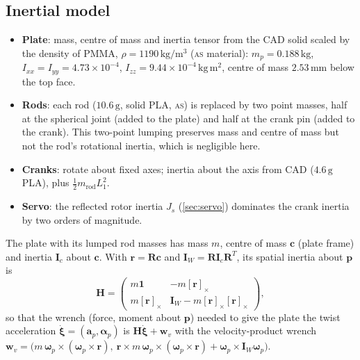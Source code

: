 \documentclass[10pt,a4paper]{article}
\newcommand{\un}[1]{\,\mathrm{#1}}
\newcommand{\vect}[1]{\bm{#1}}
\newcommand{\tagAS}{\textsc{as}}
\begin{document}
\subsection{Inertial model}
\begin{itemize}
  \item \textbf{Plate}: mass, centre of mass and inertia tensor from the CAD solid scaled by the
        density of PMMA, $\rho=1190\un{kg/m^3}$ (\tagAS{} material): $m_p=0.188\un{kg}$,
        $I_{xx}=I_{yy}=4.73\times10^{-4}$, $I_{zz}=9.44\times10^{-4}\un{kg\,m^2}$, centre of
        mass $2.53\un{mm}$ below the top face.
  \item \textbf{Rods}: each rod ($10.6\un{g}$, solid PLA, \tagAS) is replaced by two point masses,
        half at the spherical joint (added to the plate) and half at the crank pin (added to the
        crank). This two-point lumping preserves mass and centre of mass but not the rod's
        rotational inertia, which is negligible here.
  \item \textbf{Cranks}: rotate about fixed axes; inertia about the axis from CAD
        ($4.6\un{g}$ PLA), plus $\tfrac12 m_{\mathrm{rod}}L_1^2$.
  \item \textbf{Servo}: the reflected rotor inertia $J_s$ (\cref{sec:servo}) dominates the crank
        inertia by two orders of magnitude.
\end{itemize}
The plate with its lumped rod masses has mass $m$, centre of mass $\vect c$ (plate frame) and
inertia $\vect I_c$ about $\vect c$. With $\vect r=\vect R\vect c$ and
$\vect I_W=\vect R\vect I_c\vect R^T$, its spatial inertia about $\vect p$
\citep{featherstone2008rigid} is
\begin{equation}
  \vect H=\begin{pmatrix} m\vect 1 & -m[\vect r]_\times\\ m[\vect r]_\times & \vect I_W-m[\vect r]_\times[\vect r]_\times\end{pmatrix},
\end{equation}
so that the wrench (force, moment about $\vect p$) needed to give the plate the twist
acceleration $\dot{\vect\xi}=(\vect a_p,\vect\alpha_p)$ is $\vect H\dot{\vect\xi}+\vect w_v$ with the
velocity-product wrench
$\vect w_v=\bigl(m\,\vect\omega_p\times(\vect\omega_p\times\vect r),\ \vect r\times m\,\vect\omega_p\times(\vect\omega_p\times\vect r)+\vect\omega_p\times\vect I_W\vect\omega_p\bigr)$.
\end{document}
